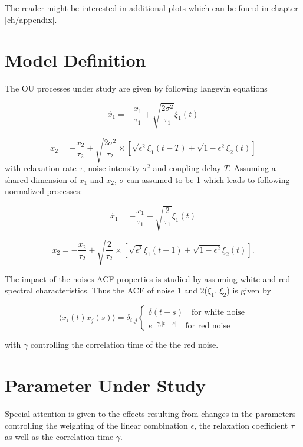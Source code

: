\documentclass[a4paper,12pt,oneside]{book}
\theoremstyle{break}
\begin{document}
The reader might be interested in additional plots which can be found in chapter \ref{ch/appendix}.

\section{Model Definition}\label{s/model}
The \ac{OU} processes under study are given by following langevin equations

\begin{equation}\label{m/ou1}
	\dot{x_1}=-\frac{x_1}{\tau_1} + \sqrt{\frac{2\sigma^2}{\tau_1}}\xi_1(t)
\end{equation}

\begin{equation}\label{m/ou2}
	\dot{x_2}=-\frac{x_2}{\tau_2} + \sqrt{\frac{2\sigma^2}{\tau_2}}\times[\sqrt{\epsilon^2}\xi_1(t - T) + \sqrt{1-\epsilon^2} \xi_2(t)]
\end{equation}
with relaxation rate $\tau$, noise intensity $\sigma^2$ and coupling delay $T$.
Assuming a shared dimension of $x_1$ and $x_2$,  $\sigma$ can assumed to be 1 which leads to following normalized processes:

\begin{equation}\label{m/ou1n}
\dot{x_1}=-\frac{x_1}{\tau_1} + \sqrt{\frac{2}{\tau_1}}\xi_1(t)
\end{equation}

\begin{equation}\label{m/ou2n}
\dot{x_2}=-\frac{x_2}{\tau_2} + \sqrt{\frac{2}{\tau_2}}\times[\sqrt{\epsilon^2}\xi_1(t - 1) + \sqrt{1-\epsilon^2} \xi_2(t)].
\end{equation}

The impact of the noises \ac{ACF} properties is studied by assuming white and red spectral characteristics. Thus the \ac{ACF} of noise 1 and 2($\xi_1$, $\xi_2$) is given by

\begin{equation}
	\langle x_i(t)x_j(s)\rangle = \delta_{i,j}
	\begin{cases} 
	\delta(t-s)  \quad \text{for white noise}\\
	e^{-\gamma_i |t-s|} \quad \text{for red noise}
	\end{cases}
\end{equation}

with $\gamma$ controlling the correlation time of the the red noise.

\section{Parameter Under Study}\label{s/intro/parameter}
Special attention is given to the effects resulting from changes in the parameters controlling the weighting of the linear combination $\epsilon$, the relaxation coefficient $\tau$ as well as the correlation time $\gamma$.
\end{document}
